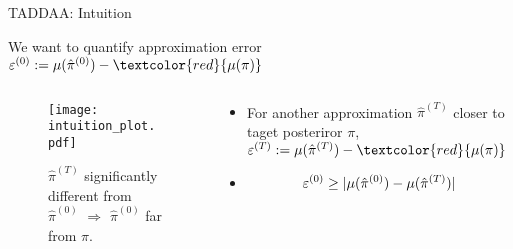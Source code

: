 \documentclass[10pt,xcolor=table]{beamer}
\begin{document}
\begin{frame}{TADDAA: Intuition}
	
  We want to quantify approximation error $\varepsilon^{(0)} \defas \mu(\initialDensity) - \textcolor{red}{\mu(\posteriorDensity)}$ 
  \begin{columns}
    \begin{column}{.44\textwidth}
      \begin{figure}[t]
        \texttt{[image: intuition\_plot.pdf]}
        \caption{$\hat{\pi}^{(T)}$ significantly different from $\hat{\pi}^{(0)}$ $\Rightarrow$ $\hat{\pi}^{(0)}$ far from $\pi$.}
      \end{figure}
    \end{column}
    \begin{column}{.6\textwidth}
        \begin{itemize}
        \item For another approximation $\hat{\pi}^{(T)}$ closer to taget posteriror $\pi$, $\varepsilon^{(T)} \defas \mu(\improvedDensity) - \textcolor{red}{\mu(\posteriorDensity)}$
        \item 
        \begin{equation*}
		\begin{aligned}
			&\varepsilon^{(0)}
			\ge |\mu(\hat{\pi}^{(0)}) - \mu(\hat{\pi}^{(T)})| \\
		\end{aligned}
		\end{equation*}
        \end{itemize}
    \end{column}
  \end{columns}
  
\end{frame}
\end{document}

